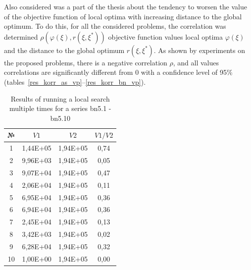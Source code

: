 \documentclass{ifacconf}
\begin{document}
Also considered was a part of the thesis about the tendency to worsen the value of the objective function of local optima
with increasing distance to the global optimum. To do this, for all the considered problems, the correlation was determined
$\rho(\varphi(\xi),r(\xi,\xi^*))$ objective function values
local optima $\varphi(\xi)$ and the distance to the global optimum $r(\xi,\xi^*)$.
As shown by experiments on the proposed problems, there is a negative correlation $\rho$, and all values
correlations are significantly different from 0 with a confidence level of 95\% (tables~\ref{res_korr_as_vp}--\ref{res_korr_bn_vp}).
\begin{table}[h!]
	\vspace{1cm}
	\centering
	\begin{tabular}{|c|c|c|c|}
		\hline
		\hspace*{0.1cm}№\hspace*{0.1cm} &
		\hspace*{0.1cm}$V1$\hspace*{0.1cm}&
		\hspace*{0.1cm}$V2$\hspace*{0.1cm}&
		\hspace*{0.1cm}$V1/V2$\hspace*{0.1cm}\\
		\hline
		1 &  1,44E+05  &  1,94E+05  &  0,74\\
		2 &  9,96E+03  &  1,94E+05  &  0,05\\
		3 &  9,07E+04  &  1,94E+05  &  0,47\\
		4 &  2,06E+04  &  1,94E+05  &  0,11\\
		5 &  6,95E+04  &  1,94E+05  &  0,36\\
		6 &  6,94E+04  &  1,94E+05  &  0,36\\
		7 &  2,45E+04  &  1,94E+05  &  0,13\\
		8 &  3,42E+03  &  1,94E+05  &  0,02\\
		9 &  6,28E+04  &  1,94E+05  &  0,32\\
		10&  1,00E+00  &  1,94E+05  &  0,00\\
		\hline
	\end{tabular}
	\vspace{1em}
	\caption{Results of running a local search multiple times for a series bn5.1 - bn5.10}	\label{spher_bn}
\end{table}
\end{document}
